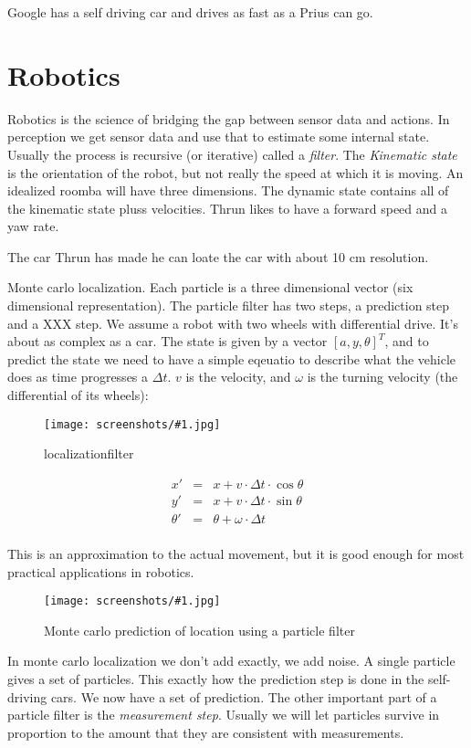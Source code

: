 \documentclass[a4, 12pt, english, USenglish]{scrreprt}
\newcommand{\screenshot}[2]{
\begin{figure}[htb]
\texttt{[image: screenshots/\#1.jpg]}
\label{#1}
\caption{#2}
\end{figure}}
\newcommand{\idx}[1]{{\em #1}\index{#1}}
\begin{document}
Google has a self driving car  and drives as fast as a Prius can go.

\section{Robotics}

Robotics is the science of bridging the gap between sensor data and
actions.  In perception we get sensor data and use that to estimate
some internal state. Usually the process is recursive (or iterative)
called a \idx{filter}.
The \idx{Kinematic state} is the orientation of the robot, but not really
the speed at which it is moving.  An idealized roomba will have three
dimensions.  The dynamic state  contains all of the kinematic state
pluss velocities.  Thrun likes to have  a forward speed and a yaw
rate.

The car Thrun has made he can loate the car with about 10 cm
resolution.

Monte carlo localization.  Each particle is a three dimensional
vector (six dimensional representation).   The particle filter has two
steps, a prediction step and a XXX step. We assume a robot with two
wheels with differential drive.  It's about as complex as a car. The
state is given by a vector \([a,y,\theta]^T\), and to predict the
state we need to have a simple eqeuatio to describe what the vehicle
does as time progresses a \(\Delta t\).  \(v\) is the velocity, and
\(\omega\) is the turning velocity (the differential of its wheels):

\screenshot{localizationfilter}{localizationfilter}

\[
\begin{array}{lcl}
x'         &=& x + v \cdot \Delta{t}\cdot\cos\theta \\
y'         &=& x + v \cdot \Delta{t}\cdot\sin\theta \\
\theta' &=& \theta + \omega \cdot \Delta{t} \\
\end{array}
\]

This is an approximation to the actual movement, but it is good enough
for most practical applications in robotics.

\screenshot{montecarloprediction}{Monte carlo prediction of location
  using a particle filter}

In monte carlo localization we don't add exactly, we add noise.  A
single particle gives a set of particles.   This exactly how the
prediction step is done in the self-driving cars.  We now have a set
of prediction.  The other important part of a particle filter is the
\idx{measurement step}.  Usually we will let particles survive in
proportion to the amount that they are consistent with measurements.
\end{document}
